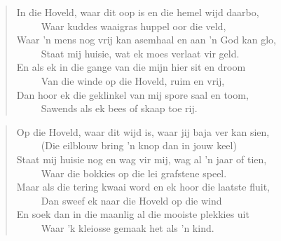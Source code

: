 \begin{verse}
In die Hoveld, waar dit oop is en die hemel wijd daarbo, \\ 
\ \ \ \ \ Waar kuddes waaigras huppel oor die veld, \\ 
Waar ’n mens nog vrij kan asemhaal en aan ’n God kan glo, \\ 
\ \ \ \ \ Staat mij huisie, wat ek moes verlaat vir geld. \\ 
En als ek in die gange van die mijn hier sit en droom \\ 
\ \ \ \ \ Van die winde op die Hoveld, ruim en vrij, \\ 
Dan hoor ek die geklinkel van mij spore saal en toom, \\ 
\ \ \ \ \ Sawends als ek bees of skaap toe rij. \\ 
\end{verse}

\begin{verse}
Op die Hoveld, waar dit wijd is, waar jij baja ver kan sien, \\ 
\ \ \ \ \ (Die eilblouw bring ’n knop dan in jouw keel) \\ 
Staat mij huisie nog en wag vir mij, wag al ’n jaar of tien, \\ 
\ \ \ \ \ Waar die bokkies op die lei grafstene speel. \\ 
Maar als die tering kwaai word en ek hoor die laatste fluit, \\ 
\ \ \ \ \ Dan sweef ek naar die Hoveld op die wind \\ 
En soek dan in die maanlig al die mooiste plekkies uit \\ 
\ \ \ \ \ Waar ’k kleiosse gemaak het als ’n kind. \\ 
\end{verse}